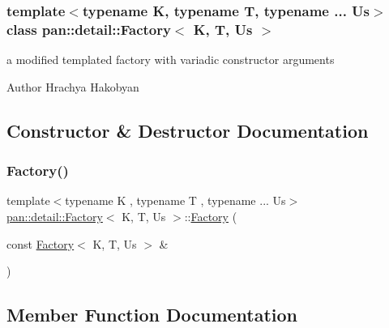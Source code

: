 \subsubsection*{template$<$typename K, typename T, typename ... Us$>$\newline
class pan\+::detail\+::\+Factory$<$ K, T, Us $>$}

a modified templated factory with variadic constructor arguments 

\begin{DoxyAuthor}{Author}
Hrachya Hakobyan 
\end{DoxyAuthor}


\subsection{Constructor \& Destructor Documentation}
\mbox{\label{classpan_1_1detail_1_1_factory_a8bede97b9ebe191c4f44d3f466f479b3}} 
\subsubsection{\texorpdfstring{Factory()}{Factory()}}
{\footnotesize\ttfamily template$<$typename K , typename T , typename ... Us$>$ \\
\hyperlink{classpan_1_1detail_1_1_factory}{pan\+::detail\+::\+Factory}$<$ K, T, Us $>$\+::\hyperlink{classpan_1_1detail_1_1_factory}{Factory} (\begin{DoxyParamCaption}\item[{const \hyperlink{classpan_1_1detail_1_1_factory}{Factory}$<$ K, T, Us $>$ \&}]{ }\end{DoxyParamCaption})\hspace{0.3cm}{\ttfamily [delete]}}



\subsection{Member Function Documentation}
\mbox{\label{classpan_1_1detail_1_1_factory_a30fe3b9f6541e9f611edb51bd54584e5}} 
